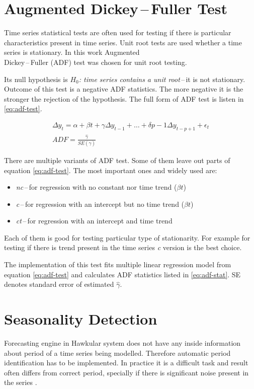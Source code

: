     \section{Augmented Dickey\,--\,Fuller Test} \label{sec:adf}
    Time series statistical tests are often used for testing if there is particular characteristics present in time
    series. Unit root tests are used whether a time series is stationary. In this work Augmented \\Dickey\,--\,Fuller
    (ADF) test was chosen for unit root testing.

    Its null hypothesis is \emph{$H_0$: time series contains a unit root}\,--\,it is not stationary. Outcome of this
    test
    is a negative ADF statistics. The more negative it is the stronger the rejection of the hypothesis.
    The full form of ADF test is listen in \ref{eq:adf-test}.

    \begin{gather} \label{eq:adf-test}
        \Delta y_t = \alpha + \beta t + \gamma \Delta y_{t-1} + \dots + \delta{p-1} \Delta y_{t-p+1} + \epsilon_t \\
        ADF = \frac{\hat{\gamma}}{SE(\hat{\gamma})} \label{eq:adf-stat}
    \end{gather}

    There are multiple variants of ADF test. Some of them leave out parts of equation \ref{eq:adf-test}. The most
    important ones and widely used are:

    \begin{itemize}
        \item \emph{nc}\,--\,for regression with no constant nor time trend ($\beta t$)
        \item \emph{c}\,--\,for regression with an intercept but no time trend ($\beta t$)
        \item \emph{ct}\,--\,for regression with an intercept and time trend
    \end{itemize}

    Each of them is good for testing particular type of stationarity. For example for testing if there is trend
    present in the time series \emph{c} version is the best choice.

    The implementation of this test fits multiple linear regression model from equation \ref{eq:adf-test} and
    calculates ADF statistics listed in \ref{eq:adf-stat}. SE denotes standard error of estimated $\hat{\gamma}$.

    \section{Seasonality Detection} \label{sec:period-detection}
    Forecasting engine in Hawkular system does not have any inside information about period of a time series being
    modelled. Therefore automatic period identification has to be implemented. In practice it is a difficult task and
    result often differs from correct period, specially if there is significant noise present in the series
    \cite{period-meteo}.


